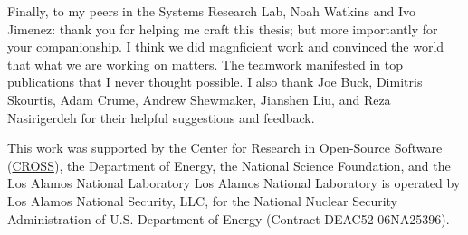 \begin{frontmatter}
\begin{acknowledgements}
Finally, to my peers in the Systems Research Lab, Noah Watkins and Ivo Jimenez:
thank you for helping me craft this thesis; but more importantly for your
companionship. I think we did magnficient work and convinced the world that
what we are working on matters.  The teamwork manifested in top publications
that I never thought possible. I also thank Joe Buck, Dimitris Skourtis, Adam
Crume, Andrew Shewmaker, Jianshen Liu, and Reza Nasirigerdeh for their helpful
suggestions and feedback.

This work was supported by the Center for Research in Open-Source Software
(\href{www.cross.soe.ucsc.edu}{CROSS}), the Department of Energy, the National
Science Foundation, and the Los Alamos National Laboratory Los Alamos National
Laboratory is operated by Los Alamos National Security, LLC, for the National
Nuclear Security Administration of U.S. Department of Energy (Contract
DEAC52-06NA25396).

	\end{acknowledgements}
\end{frontmatter}
